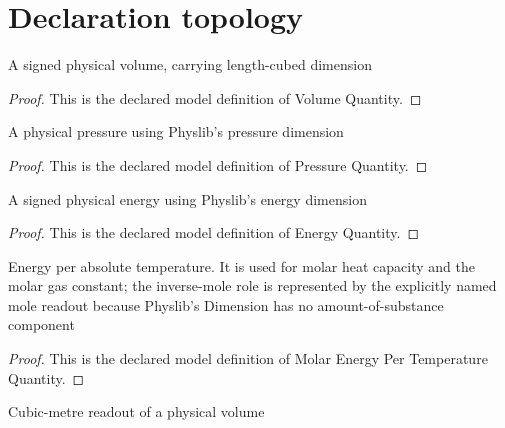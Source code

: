 \section{Declaration topology}
\begin{definition}
  \label{def:physics:phyx-mini-0357:phyxminiproblems-problemphyxmini0357-volumequantity}
  A signed physical volume, carrying length-cubed dimension
\end{definition}
\begin{proof}
  This is the declared model definition of Volume Quantity.
\end{proof}
\begin{definition}
  \label{def:physics:phyx-mini-0357:phyxminiproblems-problemphyxmini0357-pressurequantity}
  A physical pressure using Physlib's pressure dimension
\end{definition}
\begin{proof}
  This is the declared model definition of Pressure Quantity.
\end{proof}
\begin{definition}
  \label{def:physics:phyx-mini-0357:phyxminiproblems-problemphyxmini0357-energyquantity}
  A signed physical energy using Physlib's energy dimension
\end{definition}
\begin{proof}
  This is the declared model definition of Energy Quantity.
\end{proof}
\begin{definition}
  \label{def:physics:phyx-mini-0357:phyxminiproblems-problemphyxmini0357-molarenergypertemperaturequantity}
  Energy per absolute temperature. It is used for molar heat capacity and the molar gas constant; the inverse-mole role is represented by the explicitly named mole readout because Physlib's Dimension has no amount-of-substance component
\end{definition}
\begin{proof}
  This is the declared model definition of Molar Energy Per Temperature Quantity.
\end{proof}
\begin{definition}
  \label{def:physics:phyx-mini-0357:phyxminiproblems-problemphyxmini0357-volumeincubicmeters}
  Cubic-metre readout of a physical volume
\end{definition}
